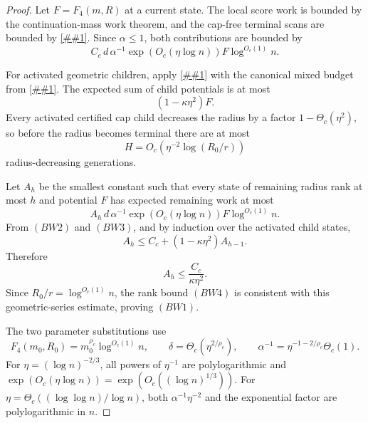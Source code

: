 \documentclass[10pt]{article}
\newcommand{\cref}[1]{\ref{##1}}
\theoremstyle{definition}
\begin{document}
\begin{proof}
   Let \(F=F_4(m,R)\) at a current state.  The local score work is bounded by
   the continuation-mass work theorem, and the cap-free terminal scans are
   bounded by \cref{lem:cap-free-scan-accounting}.  Since \(\alpha\le1\), both
   contributions are bounded by
   \[
      C_c\,d\,\alpha^{-1}\exp(O_c(\eta\log n))
      F\log^{O_c(1)}n .
      \tag{BW2}
   \]

   For activated geometric children, apply
   \cref{lem:budget-thinned-opportunities} with the canonical mixed budget from
   \cref{lem:canonical-mixed-budget}.  The expected sum of child potentials is
   at most
   \[
      (1-\kappa\eta^2)F .
      \tag{BW3}
   \]
   Every activated certified cap child decreases the radius by a factor
   \(1-\Theta_c(\eta^2)\), so before the radius becomes terminal there are at
   most
   \[
      H=O_c\!\left(\eta^{-2}\log(R_0/r)\right)
      \tag{BW4}
   \]
   radius-decreasing generations.

   Let \(A_h\) be the smallest constant such that every state of remaining
   radius rank at most \(h\) and potential \(F\) has expected remaining work at
   most
   \[
      A_h\,d\,\alpha^{-1}\exp(O_c(\eta\log n))
      F\log^{O_c(1)}n .
   \]
   From \((BW2)\) and \((BW3)\), and by induction over the activated child
   states,
   \[
      A_h\le C_c+(1-\kappa\eta^2)A_{h-1}.
   \]
   Therefore
   \[
      A_h\le \frac{C_c}{\kappa\eta^2}.
   \]
   Since \(R_0/r=\log^{O_c(1)}n\), the rank bound \((BW4)\) is consistent with
   this geometric-series estimate, proving \((BW1)\).

   The two parameter substitutions use
   \[
      F_4(m_0,R_0)=m_0^{\rho_c}\log^{O_c(1)}n,
      \qquad
      \delta=\Theta_c(\eta^{2/\rho_c}),
      \qquad
      \alpha^{-1}=\eta^{-1-2/\rho_c}\Theta_c(1).
   \]
   For \(\eta=(\log n)^{-2/3}\), all powers of \(\eta^{-1}\) are
   polylogarithmic and \(\exp(O_c(\eta\log n))=\exp(O_c((\log n)^{1/3}))\).
   For \(\eta=\Theta_c((\log\log n)/\log n)\), both
   \(\alpha^{-1}\eta^{-2}\) and the exponential factor are polylogarithmic in
   \(n\).
\end{proof}
\end{document}
